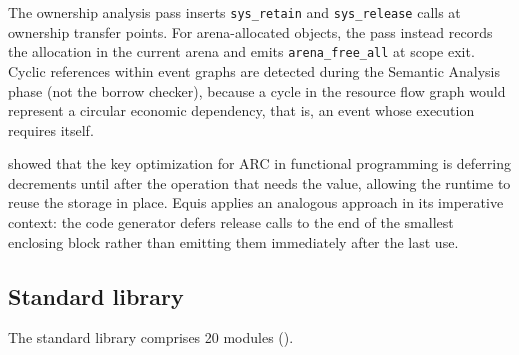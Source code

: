 \documentclass[11pt,a4paper]{article}
\theoremstyle{remark}
\begin{document}
The ownership analysis pass inserts \texttt{sys\_retain} and
\texttt{sys\_release} calls at ownership transfer points. For
arena-allocated objects, the pass instead records the allocation in the
current arena and emits \texttt{arena\_free\_all} at scope exit. Cyclic
references within event graphs are detected during the Semantic
Analysis phase (not the borrow checker), because a cycle in the
resource flow graph would represent a circular economic dependency,
that is, an event whose execution requires itself.

\citet{ullrich_counting_2021} showed that the key optimization for ARC in
functional programming is deferring decrements until after the
operation that needs the value, allowing the runtime to reuse the
storage in place. Equis applies an analogous approach in its imperative
context: the code generator defers release calls to the end of the
smallest enclosing block rather than emitting them immediately after
the last use.

\subsection{Standard library}

The standard library comprises 20 modules ().
\end{document}
